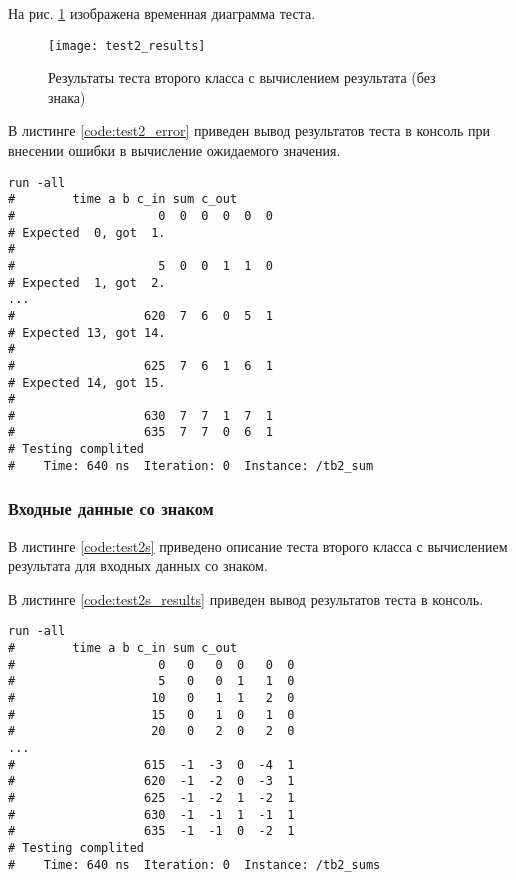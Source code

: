 На рис. \ref{fig:test2_results} изображена временная диаграмма теста.
\vspace{-0.5cm}
\begin{figure}[H]
	\begin{center}
		\texttt{[image: test2\_results]}
		\caption{Результаты теста второго класса с вычислением результата (без знака)}
		\label{fig:test2_results}
	\end{center}
\end{figure}

В листинге \ref{code:test2_error} приведен вывод результатов теста в консоль при внесении ошибки в вычисление ожидаемого значения.	
\begin{lstlisting}[caption=Результаты ошибочного теста второго класса с вычислением результата (без знака), label=code:test2_error, style=console]
run -all
# 		 time a b c_in sum c_out
#                    0  0  0  0  0  0
# Expected  0, got  1.
# 
#                    5  0  0  1  1  0
# Expected  1, got  2.
...
#                  620  7  6  0  5  1
# Expected 13, got 14.
# 
#                  625  7  6  1  6  1
# Expected 14, got 15.
# 
#                  630  7  7  1  7  1
#                  635  7  7  0  6  1
# Testing complited
#    Time: 640 ns  Iteration: 0  Instance: /tb2_sum
\end{lstlisting}

\subsubsection{Входные данные со знаком}

В листинге \ref{code:test2s} приведено описание теста второго класса с вычислением результата для входных данных со знаком.


В листинге \ref{code:test2s_results} приведен вывод результатов теста в консоль.
\begin{lstlisting}[caption=Результаты теста второго класса с вычислением результата (со знаком), label=code:test2s_results, style=console]
run -all
# 		 time a b c_in sum c_out
#                    0   0   0  0   0  0
#                    5   0   0  1   1  0
#                   10   0   1  1   2  0
#                   15   0   1  0   1  0
#                   20   0   2  0   2  0
...
#                  615  -1  -3  0  -4  1
#                  620  -1  -2  0  -3  1
#                  625  -1  -2  1  -2  1
#                  630  -1  -1  1  -1  1
#                  635  -1  -1  0  -2  1
# Testing complited
#    Time: 640 ns  Iteration: 0  Instance: /tb2_sums
\end{lstlisting}

